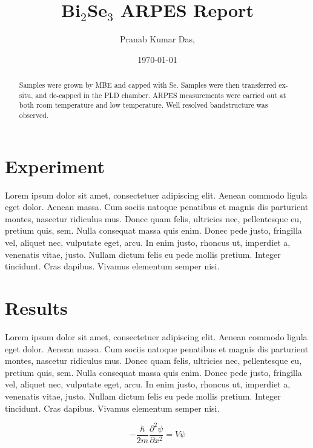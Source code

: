 \documentclass[DIV=calc, paper=a4, fontsize=12pt]{scrartcl}
\title{Bi$_2$Se$_3$ ARPES Report }
\author{Pranab Kumar Das, }
\date{\vspace{-10pt}\today}
\begin{document}
\maketitle
\thispagestyle{fancy}

\begin{abstract}
\noindent Samples were grown by MBE and capped with Se. Samples were then transferred ex-situ, and de-capped in the PLD chamber. ARPES measurements were carried out at both room temperature and low temperature. Well resolved bandstructure was observed.
\end{abstract}

\section*{Experiment}
Lorem ipsum dolor sit amet, consectetuer adipiscing elit. Aenean commodo ligula eget dolor. Aenean massa. Cum sociis natoque penatibus et magnis dis parturient montes, nascetur ridiculus mus. Donec quam felis, ultricies nec, pellentesque eu, pretium quis, sem. Nulla consequat massa quis enim. Donec pede justo, fringilla vel, aliquet nec, vulputate eget, arcu. In enim justo, rhoncus ut, imperdiet a, venenatis vitae, justo. Nullam dictum felis eu pede mollis pretium. Integer tincidunt. Cras dapibus. Vivamus elementum semper nisi.

\section*{Results}
Lorem ipsum dolor sit amet, consectetuer adipiscing elit. Aenean commodo ligula eget dolor. Aenean massa. Cum sociis natoque penatibus et magnis dis parturient montes, nascetur ridiculus mus. Donec quam felis, ultricies nec, pellentesque eu, pretium quis, sem. Nulla consequat massa quis enim. Donec pede justo, fringilla vel, aliquet nec, vulputate eget, arcu. In enim justo, rhoncus ut, imperdiet a, venenatis vitae, justo. Nullam dictum felis eu pede mollis pretium. Integer tincidunt. Cras dapibus. Vivamus elementum semper nisi.

\begin{equation}
    -\frac{\hbar}{2m} \frac{\partial^2\psi}{\partial x^2} = V \psi
\end{equation}
\end{document}
